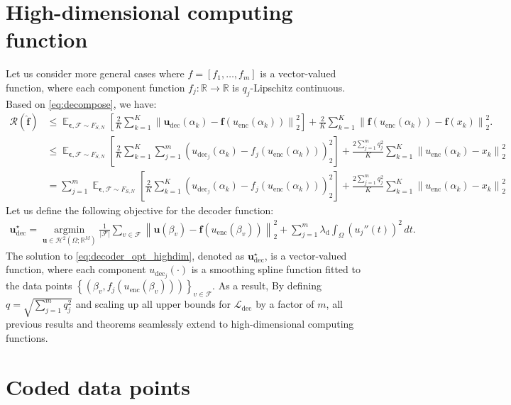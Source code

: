 \documentclass{article}
\def\dec{\mathbf{u}_\textrm{dec}}
\def\encs{u_\textrm{enc}}
\def\decsj{u_{\textrm{dec}_j}}
\def\declamb{\lambda_\textrm{d}}
\def\ldec{\mathcal{L}_\textrm{dec}}
\def\func{\mathbf{f}}
\def\stset{\mathcal{F}}
\def\fhat{\mathbf{\hat{f}}}
\newcommand{\norm}[1]{\left\lVert#1\right\rVert}
\newcommand{\hilm}[1]{\mathcal{H}^{#1}\left(\Omega;\mathbb{R}^M\right)}
\begin{document}
\section{High-dimensional computing function}\label{app:hdim_f}
Let us consider more general cases where $f = [f_1,\dots,f_m]$ is a vector-valued function, where each component function $f_j:\mathbb{R} \to \mathbb{R}$ is $q_j$-Lipschitz continuous. Based on \eqref{eq:decompose}, we have:
\begin{align}
    \mathcal{R}(\fhat)&\leqslant \mathop{\mathbb{E}}_{\bm{\epsilon}, \stset \sim F_{S,N}} \left[\frac{2}{K} \sum^K_{k=1} \norm{\dec(\alpha_k) - \func(\encs(\alpha_k))}^2_2\right] +  \frac{2}{K} \sum^K_{k=1} \norm{\func(\encs(\alpha_k)) - \func(x_k)}^2_2.\nonumber \\
    &\leqslant \mathop{\mathbb{E}}_{\bm{\epsilon}, \stset \sim F_{S,N}}\left[\frac{2}{K} \sum^K_{k=1} \sum^m_{j=1} \left(\decsj(\alpha_k) - f_j(\encs(\alpha_k))\right)^2_2\right] + \frac{2\sum^m_{j=1}q_j^2}{K} \sum^K_{k=1} \norm{\encs(\alpha_k) - x_k}^2_2 \nonumber \\ \nonumber
    &= \sum^m_{j=1} \mathop{\mathbb{E}}_{\bm{\epsilon}, \stset \sim F_{S,N}}\left[\frac{2}{K} \sum^K_{k=1}  \left(\decsj(\alpha_k) - f_j(\encs(\alpha_k))\right)^2_2\right] + \frac{2\sum^m_{j=1}q_j^2}{K} \sum^K_{k=1} \norm{\encs(\alpha_k) - x_k}^2_2 
\end{align}
Let us define the following objective for the decoder function:
\begin{align}\label{eq:decoder_opt_highdim}
    \dec^\star=\underset{\mathbf{u} \in \hilm{2}}{\operatorname{argmin}} \frac{1}{|\stset|} \sum_{v \in \stset}\norm{\mathbf{u}\left(\beta_v\right)-\func\left(\encs\left(\beta_v\right)\right)}^2_2 + \sum^m_{j=1} \declamb \int_{\Omega} \left(u_j''(t)\right)^2\,dt.
\end{align}
The solution to \eqref{eq:decoder_opt_highdim}, denoted as $\dec^\star$, is a vector-valued function, where each component $\decsj(\cdot)$ is a smoothing spline function fitted to the data points $\left\{\left(\beta_v, f_j\left(\encs\left(\beta_v\right)\right)\right)\right\}_{v \in \stset}$. As a result, By defining $q=\sqrt{\sum^m_{j=1}q_j^2}$ and scaling up all upper bounds for $\ldec$ by a factor of $m$, all previous results and theorems seamlessly extend to high-dimensional computing functions.
\section{Coded data points}\label{sec:apx_coded_sample}
\end{document}

